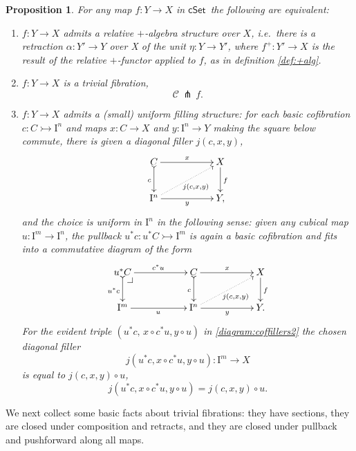 \documentclass[12pt]{article}
\makeatletter
\newcommand{\cSet}{\ensuremath{\mathsf{cSet}}}
\newcommand{\mono}{\ensuremath{\rightarrowtail}}
\newcommand{\ra}{\ensuremath{\rightarrow}}
\newcommand{\I}{\ensuremath{\mathrm{I}}}
\newtheorem{proposition}[theorem]{Proposition}
\theoremstyle{remark}
\theoremstyle{definition}
\newcommand{\pbcorner}[1][dr]{\save*!/#1-1.2pc/#1:(-1,1)@^{|-}\restore}
\makeatother
\begin{document}
 \begin{proposition}\label{prop:uniformstructequivrelative} For any map $f : Y\ra X$ in \cSet\ the following are equivalent:
\begin{enumerate}
\item $f:Y\ra X$ admits a \emph{relative $+$-algebra structure over $X$}, i.e.\ there is a retraction  $\alpha :Y' \ra Y$ over X of the unit $\eta : Y\ra Y'$, where $f^+ : Y' \ra X$ is the result of the relative $+$-functor applied to $f$, as in definition \ref{def:+alg}.
\item $f:Y\ra  X$ is a \emph{trivial fibration},
\[
\mathcal{C}\, \pitchfork\,f.
\]
\item $f:Y\ra  X$ admits a (small) \emph{uniform filling structure}: 
for each basic cofibration $c : C \mono \I^{n}$ and maps $x : C\ra X$ and $y : \I^n\ra Y$ making the square below commute, there is given a diagonal filler $j(c,x,y)$,
\begin{equation}\label{diagram:coffillers}
\xymatrix{
C \ar@{>->}[d]_{c} \ar[rr]^{x} && X \ar[d]^{f} \\
\I^{n}\ar@{.>}[rru]_{j(c,x,y)} \ar[rr]_{y} && Y,
}
\end{equation}
and the choice is \emph{uniform in $\I^n$} in the following sense: given any cubical map $u : \I^m \ra \I^n$, the pullback $u^*c : u^*C\mono \I^m$ is again a basic cofibration and fits into a commutative diagram of the form
\begin{equation}\label{diagram:coffillers2}
\xymatrix{
u^*C \ar@{>->}[d]_{u^*c} \ar[rr]^{c^*u} \pbcorner &&  C \ar@{>->}[d]_{c} \ar[rr]^{x} && X\ar[d]^{f} \\
\I^{m} \ar[rr]_{u} && \I^{n} \ar@{.>}[rru]_{j(c,x,y)} \ar[rr]_{y} && Y.
}
\end{equation}
For the evident triple $(u^*c,\, x\circ c^*u, y\circ u)$ in \eqref{diagram:coffillers2} the chosen diagonal filler $$j(u^*c,x\circ c^*u,y\circ u): \I^m \ra X$$ is equal to  $j(c,x,y)\circ u$,
\begin{equation}\label{eq:uniformfillers}
j(u^*c, x\circ c^*u,y\circ u) = j(c,x,y)\circ u.
\end{equation}
\end{enumerate}
\end{proposition}

We next collect some basic facts about trivial fibrations: they have sections, they are closed under composition and retracts, and they are closed under pullback and pushforward along all maps.
\end{document}
